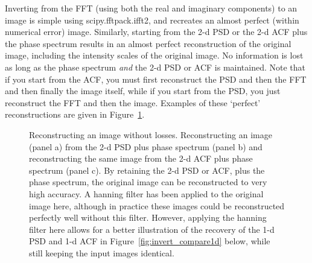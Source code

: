 \documentclass[11pt,preprint]{aastex}
\begin{document}
Inverting from the FFT (using both the real and imaginary components) to an image is simple using scipy.fftpack.ifft2, and recreates an almost perfect (within numerical error) image. Similarly, starting from the 2-d PSD or the 2-d ACF plus the phase spectrum results in an almost perfect reconstruction of the original image, including the intensity scales of the original image. No information is lost as long as the phase spectrum {\it and} the 2-d PSD or ACF is maintained. Note that if you start from the ACF, you must first reconstruct the PSD and then the FFT and then finally the image itself, while if you start from the PSD, you just reconstruct the FFT and then the image. Examples of these `perfect' reconstructions are given in Figure~\ref{fig:invert_perfect}. 

\begin{figure}[htpb]
\centering
{}
\caption{{\small
Reconstructing an image without losses. Reconstructing an image (panel a) from the 2-d PSD plus phase spectrum (panel b) and reconstructing the same image from the 2-d ACF plus phase spectrum (panel c). By retaining the 2-d PSD or ACF, plus the phase spectrum, the original image can be reconstructed to very high accuracy.  A hanning filter has been applied to the original image here, although in practice these images could be reconstructed perfectly well without this filter. However, applying the hanning filter here allows for a better illustration of the recovery of the 1-d PSD and 1-d ACF in Figure~\ref{fig:invert_compare1d} below, while still keeping the input images identical.}}
\label{fig:invert_perfect}
\end{figure}
\end{document}
